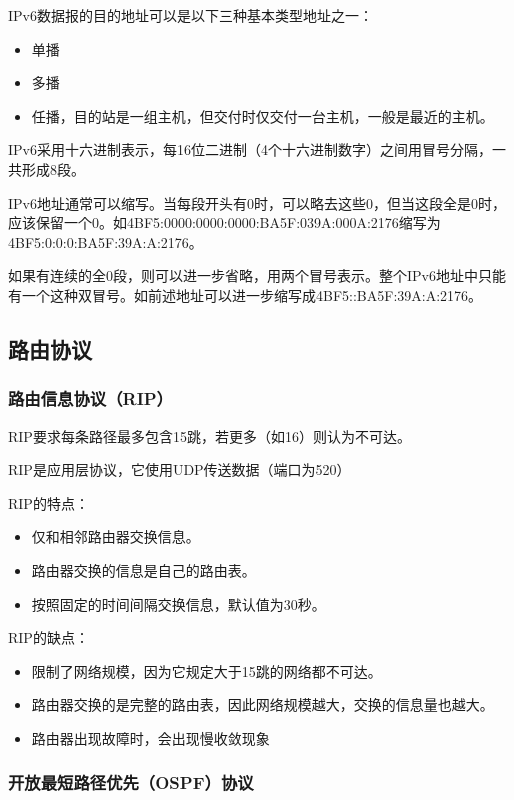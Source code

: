 \documentclass[12pt, a4paper, oneside]{ctexart}
\begin{document}
IPv6数据报的目的地址可以是以下三种基本类型地址之一：
\begin{itemize}
    \item 单播
    \item 多播
    \item 任播，目的站是一组主机，但交付时仅交付一台主机，一般是最近的主机。
\end{itemize}

IPv6采用十六进制表示，每16位二进制（4个十六进制数字）之间用冒号分隔，一共形成8段。

IPv6地址通常可以缩写。当每段开头有0时，可以略去这些0，但当这段全是0时，应该保留一个0。如4BF5:0000:0000:0000:BA5F:039A:000A:2176缩写为4BF5:0:0:0:BA5F:39A:A:2176。

如果有连续的全0段，则可以进一步省略，用两个冒号表示。整个IPv6地址中只能有一个这种双冒号。如前述地址可以进一步缩写成4BF5::BA5F:39A:A:2176。

\subsection{路由协议}

\subsubsection{路由信息协议（RIP）}

RIP要求每条路径最多包含15跳，若更多（如16）则认为不可达。

RIP是应用层协议，它使用UDP传送数据（端口为520）

RIP的特点：
\begin{itemize}
    \item 仅和相邻路由器交换信息。
    \item 路由器交换的信息是自己的路由表。
    \item 按照固定的时间间隔交换信息，默认值为30秒。
\end{itemize}

RIP的缺点：
\begin{itemize}
    \item 限制了网络规模，因为它规定大于15跳的网络都不可达。
    \item 路由器交换的是完整的路由表，因此网络规模越大，交换的信息量也越大。
    \item 路由器出现故障时，会出现慢收敛现象
\end{itemize}

\subsubsection{开放最短路径优先（OSPF）协议}
\end{document}
